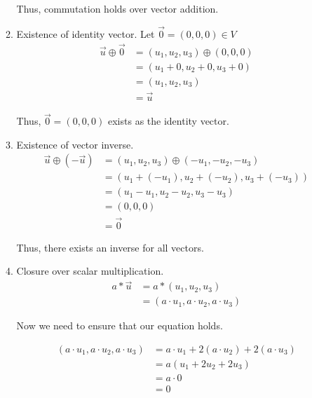 \documentclass[12pt,letterpaper]{article}
\begin{document}
\begin{enumerate}
\begin{enumerate}
           Thus, commutation holds over vector addition.
           
         \item Existence of identity vector.
           Let $\vec{0} = (0, 0, 0) \in V$
           \begin{align*}
             \vec{u} \oplus \vec{0} &= (u_1, u_2, u_3) \oplus (0, 0, 0) \\
             &= (u_1 + 0, u_2 + 0, u_3 + 0) \\
             &= (u_1, u_2, u_3) \\
             &= \vec{u}
           \end{align*}
           
           Thus, $\vec{0} = (0, 0, 0)$ exists as the identity vector.
           
         \item Existence of vector inverse.
           \begin{align*}
             \vec{u} \oplus (-\vec{u}) &= (u_1, u_2, u_3) \oplus (-u_1, -u_2, -u_3) \\
             &= (u_1 + (-u_1), u_2 + (-u_2), u_3 + (-u_3)) \\
             &= (u_1 - u_1, u_2 - u_2, u_3 - u_3) \\
             &= (0, 0, 0) \\
             &= \vec{0}
           \end{align*}
           
           Thus, there exists an inverse for all vectors.
           
         \item Closure over scalar multiplication.
           \begin{align*}
             a * \vec{u} &= a * (u_1, u_2, u_3) \\
             &= (a \cdot u_1, a \cdot u_2, a \cdot u_3)
           \end{align*}
           
           Now we need to ensure that our equation holds.
           
           \begin{align*}
             (a \cdot u_1, a \cdot u_2, a \cdot u_3) &= a \cdot u_1 + 2(a \cdot u_2) + 2(a \cdot u_3) \\
             &= a (u_1 + 2u_2 + 2u_3) \\
             &= a \cdot 0 \\
             &= 0
           \end{align*}
           

\end{enumerate}
\end{enumerate}
\end{document}
